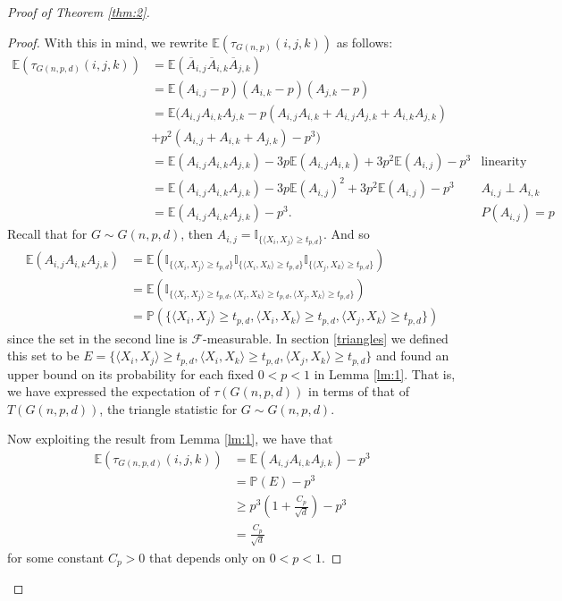 \documentclass{article}
\begin{document}
\begin{proof}[Proof of Theorem \ref{thm:2}]
\begin{proof}
With this in mind, we rewrite $\mathbb{E}(\tau_{G(n,p)}(i,j,k))$ as follows:
\begin{align*}
    \mathbb{E}\left( \tau_{G(n,p,d)}(i,j,k) \right) &= \mathbb{E} \left( \overline{A}_{i,j}\overline{A}_{i,k}\overline{A}_{j,k} \right)\\
    &= \mathbb{E} (A_{i,j} - p)(A_{i,k} - p)(A_{j,k} - p)\\
    &= \mathbb{E} (A_{i,j}A_{i,k}A_{j,k} - p(A_{i,j}A_{i,k} + A_{i,j}A_{j,k} + A_{i,k}A_{j,k})\\
    &+  p^2(A_{i,j} + A_{i,k} + A_{j,k}) - p^3)\\
    &= \mathbb{E} (A_{i,j}A_{i,k}A_{j,k}) - 3p\mathbb{E}(A_{i,j}A_{i,k}) + 3p^2 \mathbb{E}(A_{i,j}) -p^3 & \text{linearity}\\
    &= \mathbb{E} (A_{i,j}A_{i,k}A_{j,k}) - 3p\mathbb{E}(A_{i,j})^2 + 3p^2 \mathbb{E}(A_{i,j}) -p^3 & A_{i,j} \perp A_{i,k}\\
    &= \mathbb{E} (A_{i,j}A_{i,k}A_{j,k}) - p^3. & P(A_{i,j}) = p
\end{align*}
Recall that for $G \sim G(n,p,d)$, then $A_{i,j} = \mathbb{I}_{\{\langle X_i, X_j \rangle \geq t_{p,d}\}}$. And so 
\begin{align*}
    \mathbb{E}(A_{i,j}A_{i,k}A_{j,k}) &= \mathbb{E}\left(\mathbb{I}_{\{\langle X_i, X_j \rangle \geq t_{p,d}\}}\mathbb{I}_{\{\langle X_i, X_k \rangle \geq t_{p,d}\}}\mathbb{I}_{\{\langle X_j, X_k \rangle \geq t_{p,d}\}} \right)\\
    &= \mathbb{E} \left(\mathbb{I}_{\{\langle X_i, X_j \rangle \geq t_{p,d}, \langle X_i, X_k \rangle \geq t_{p,d}, \langle X_j, X_k \rangle \geq t_{p,d}\}} \right)\\
    &= \mathbb{P}(\{\langle X_i, X_j \rangle \geq t_{p,d}, \langle X_i, X_k \rangle \geq t_{p,d}, \langle X_j, X_k \rangle \geq t_{p,d}\})
\end{align*}
since the set in the second line is $\mathcal{F}$-measurable. In section \ref{triangles} we defined this set to be $E = \{\langle X_i, X_j \rangle \geq t_{p,d}, \langle X_i, X_k \rangle \geq t_{p,d}, \langle X_j, X_k \rangle \geq t_{p,d}\}$ and found an upper bound on its probability for each fixed $0<p<1$ in Lemma \ref{lm:1}. That is, we have expressed the expectation of $\tau(G(n,p,d))$ in terms of that of $T(G(n,p,d))$, the triangle statistic for $G \sim G(n,p,d)$.

Now exploiting the result from Lemma \ref{lm:1}, we have that 
\begin{align*}
    \mathbb{E}\left( \tau_{G(n,p,d)}(i,j,k) \right) &= \mathbb{E} (A_{i,j}A_{i,k}A_{j,k}) - p^3\\
    &=  \mathbb{P}(E) - p^3\\
    &\geq p^3 \left(1 + \frac{C_p}{\sqrt{d}} \right) -p^3\\
    &= \frac{C_p}{\sqrt{d}}
\end{align*}
for some constant $C_p > 0$ that depends only on $0 < p < 1$.


\end{proof}
\end{proof}
\end{document}

